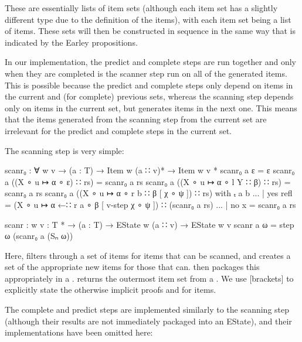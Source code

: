 		These are essentially lists of item sets (although each item set has a
		slightly different type due to the definition of the items), with each
		item set being a list of items. These sets will then be constructed in
		sequence in the same way that is indicated by the Earley propositions.

		In our implementation, the predict and complete steps are run together
		and only when they are completed is the scanner step run on all of the
		generated items. This is possible because the predict and complete
		steps only depend on items in the current and (for complete) previous
		sets, whereas the scanning step depends only on items in the current
		set, but generates items in the next one. This means that the items
		generated from the scanning step from the current set are irrelevant
		for the predict and complete steps in the current set.

		The scanning step is very simple:

		\begin{code}
			  scanr₀ : ∀ {w v} →
			    (a : T) →
			    Item w (a ∷ v)* →
			    Item w v *
			  scanr₀ a ε = ε
			  scanr₀ a ((X ∘ u ↦ α ∘ ε) ∷ rs) = scanr₀ a rs
			  scanr₀ a ((X ∘ u ↦ α ∘ l Y ∷ β) ∷ rs) = scanr₀ a rs
			  scanr₀ a ((X ∘ u ↦ α ∘ r b ∷ β [ χ ∘ ψ ]) ∷ rs) with ₜ a b
			  ... | yes refl = (X ∘ u ↦ α ←∷ r a ∘ β [ v-step χ ∘ ψ ]) ∷ (scanr₀ a rs)
			  ... | no x = scanr₀ a rs

			  scanr : {w v : T *} →
			    (a : T) →
			    EState w (a ∷ v) →
			    EState w v
			  scanr a ω = step ω (scanr₀ a (Sₙ ω))
		\end{code}

		Here,  filters through a set of items for items that can
		be scanned, and creates a set of the appropriate new items for those
		that can.  then packages this appropriately in a
		.  returns the outermost item set from a
		. We use [brackets] to explicitly state the otherwise
		implicit proofs  and  for items.

		The complete and predict steps are implemented similarly to the
		scanning step (although their results are not immediately packaged into
		an EState), and their implementations have been omitted here:

